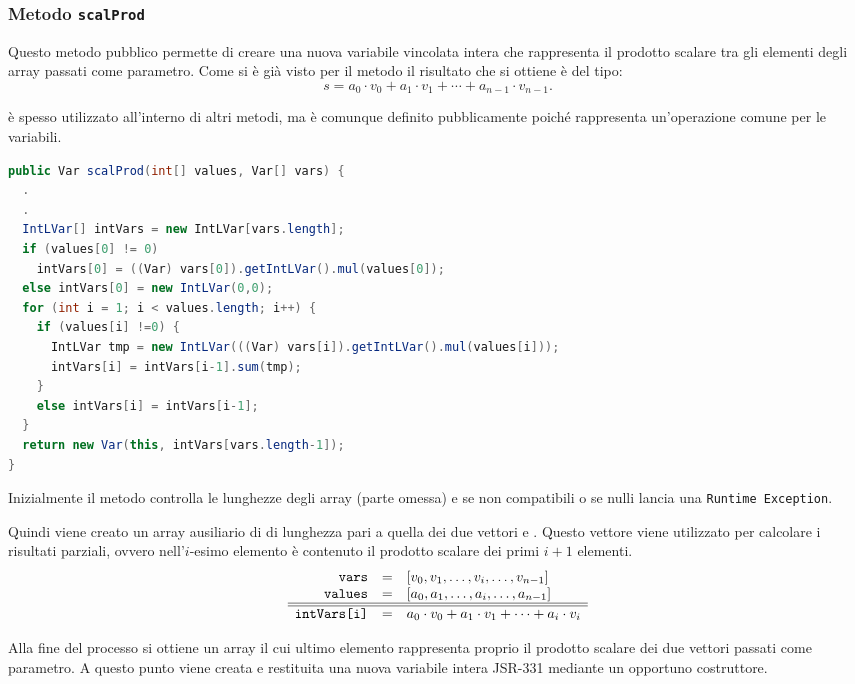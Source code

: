 \subsubsection{Metodo \texttt{scalProd}}
Questo metodo pubblico permette di creare una nuova variabile vincolata
intera che rappresenta il prodotto scalare tra gli elementi degli array
passati come parametro. Come si è già visto per il metodo  il
risultato che si ottiene è del tipo:
\[
s = a_0\cdot v_0 + a_1\cdot v_1 + \cdots + a_{n-1}\cdot v_{n-1}.
\]

 è spesso utilizzato all'interno di altri metodi, ma è comunque
definito pubblicamente poiché rappresenta un'operazione comune per le variabili.

\begin{lstlisting}[language = Java,
                   caption = {\files{scalProd}.}]
public Var scalProd(int[] values, Var[] vars) {
  .
  .
  IntLVar[] intVars = new IntLVar[vars.length];
  if (values[0] != 0)
    intVars[0] = ((Var) vars[0]).getIntLVar().mul(values[0]);
  else intVars[0] = new IntLVar(0,0);
  for (int i = 1; i < values.length; i++) {
    if (values[i] !=0) {
      IntLVar tmp = new IntLVar(((Var) vars[i]).getIntLVar().mul(values[i]));
      intVars[i] = intVars[i-1].sum(tmp);
    }
    else intVars[i] = intVars[i-1];
  }
  return new Var(this, intVars[vars.length-1]);
}
\end{lstlisting}
Inizialmente il metodo controlla le lunghezze degli array (parte omessa) e se
non compatibili o se nulli lancia una \texttt{Runtime Exception}.

Quindi viene creato un array ausiliario di  di lunghezza pari
a quella dei due vettori  e . Questo vettore viene
utilizzato per calcolare i risultati parziali, ovvero nell'$i$-esimo elemento
è contenuto il prodotto scalare dei primi $i+1$ elementi.
\[
\begin{array}{rcl}
\texttt{vars} & = & [v_0, v_1, \ldots, v_i, \ldots, v_{n-1}] \\
\texttt{values} & = &  [a_0, a_1, \ldots, a_i, \ldots, a_{n-1}] \\
\hline
\hline
\texttt{intVars[i]} & = & a_0\cdot v_0 + a_1\cdot v_1 + \cdots + a_i\cdot v_i
\end{array}
\] 

Alla fine del processo si ottiene un array il cui ultimo elemento rappresenta
proprio il prodotto scalare dei due vettori passati come parametro.
A questo punto viene creata e restituita una nuova variabile intera JSR-331
mediante un opportuno costruttore.

